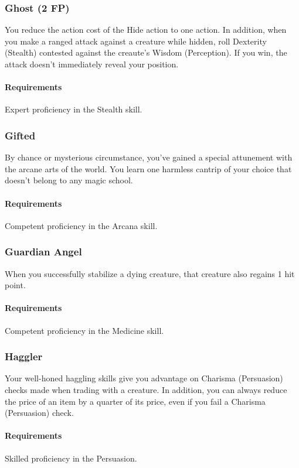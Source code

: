 \subsubsection{Ghost (2 FP)} \label{feat::ghost}
    You reduce the action cost of the Hide action to one action.
    In addition, when you make a ranged attack against a creature while hidden, roll Dexterity (Stealth) contested against the creaute's Wisdom (Perception).
    If you win, the attack doesn't immediately reveal your position.
    \paragraph{Requirements} Expert proficiency in the Stealth skill.
\subsubsection{Gifted} \label{feat::gifted}
    By chance or mysterious circumstance, you've gained a special attunement with the arcane arts of the world.
    You learn one harmless cantrip of your choice that doesn't belong to any magic school.
    \paragraph{Requirements} Competent proficiency in the Arcana skill.
\subsubsection{Guardian Angel} \label{feat::guardianangel}
    When you successfully stabilize a dying creature, that creature also regains 1 hit point.
    \paragraph{Requirements} Competent proficiency in the Medicine skill.
\subsubsection{Haggler} \label{feat::haggler}
    Your well-honed haggling skills give you advantage on Charisma (Persuasion) checks made when trading with a creature.
    In addition, you can always reduce the price of an item by a quarter of its price, even if you fail a Charisma (Persuasion) check.
    \paragraph{Requirements} Skilled proficiency in the Persuasion.
